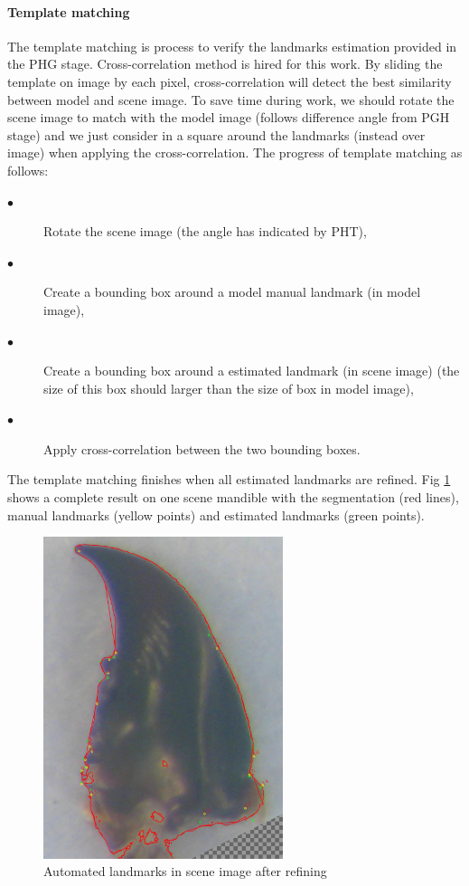 \documentclass[twoside,twocolumn,10pt]{article}
\begin{document}
\paragraph{Template matching}
The template matching is process to verify the landmarks estimation
provided in the PHG stage. Cross-correlation method\cite{knapp1976generalized} is hired for this work. By sliding the template on image by each pixel, cross-correlation will detect the best similarity between model and scene image. To save time during work, we should rotate the scene image to match with the model image (follows difference angle from PGH stage) and we just consider in a square around the landmarks (instead over image) when applying the cross-correlation. The progress of template matching as follows:
{\small{
\begin{description}
\item[$\bullet$] Rotate the scene image (the angle has indicated by PHT),
\item[$\bullet$] Create a bounding box around a model manual landmark (in model image),
\item[$\bullet$] Create a bounding box around a estimated landmark (in scene image) (the size of this box should larger than the size of box in model image),
\item[$\bullet$] Apply cross-correlation between the two bounding boxes.
\end{description}
}}
The template matching finishes when all estimated landmarks are
refined. Fig \ref{lm_hist} shows a complete result on one scene
mandible with the segmentation (red lines), manual landmarks (yellow
points) and estimated landmarks (green points).
\begin{figure}[h!]
\centering
\includegraphics[width=7cm]{./images/Screenshot3.png}
\caption{\small{Automated landmarks in scene image after refining}}
\label{lm_hist}
\end{figure}
\end{document}
